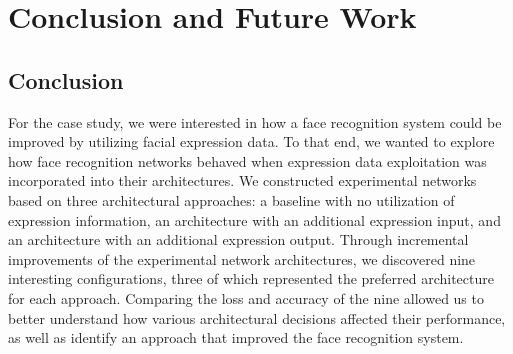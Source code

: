 
\chapter{Conclusion and Future Work}

\section{Conclusion}





\noindent For the case study, we were interested in how a face recognition system could be improved by utilizing facial expression data. To that end, we wanted to explore how face recognition networks behaved when expression data exploitation was incorporated into their architectures. We constructed experimental networks based on three architectural approaches: a baseline with no utilization of expression information, an architecture with an additional expression input, and an architecture with an additional expression output. Through incremental improvements of the experimental network architectures, we discovered nine interesting configurations, three of which represented the preferred architecture for each approach. Comparing the loss and accuracy of the nine allowed us to better understand how various architectural decisions affected their performance, as well as identify an approach that improved the face recognition system. \\

